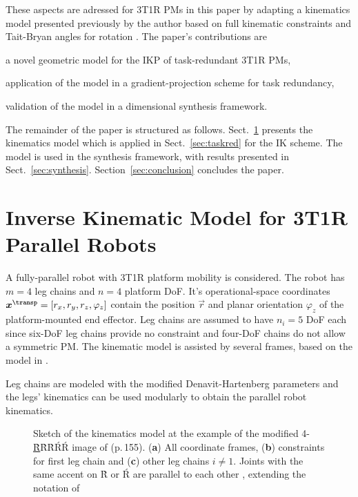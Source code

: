 \documentclass[
	graybox,
	vecphys] %
	{svmult}
\newcommand{\ortvek}[4]{{ }_{(#1)}{\boldsymbol{#2}}^{#3}_{#4} }
\begin{document}
These aspects are adressed for 3T1R PMs in this paper by adapting a kinematics model presented previously by the author based on full kinematic constraints and Tait-Bryan angles for rotation \cite{SchapplerTapOrt2019}.
%
The paper's contributions are
\begin{compactitem}
\item a novel geometric model for the IKP of task-redundant 3T1R PMs, 
\item application of the model in a gradient-projection scheme for task redundancy,
\item validation of the model in a dimensional synthesis framework.
\end{compactitem}

The remainder of the paper is structured as follows. Sect.~\ref{sec:model} presents the kinematics model which is applied in 
Sect.~\ref{sec:taskred} for the IK scheme.
The model is used in the synthesis framework, with results presented in Sect.~\ref{sec:synthesis}.
Section~\ref{sec:conclusion} concludes the paper.

\vspace{-0.3cm}
\section{Inverse Kinematic Model for 3T1R Parallel Robots}
\label{sec:model}

A fully-parallel robot with 3T1R platform mobility is considered.
The robot has $m=4$ leg chains and $n=4$ platform DoF.
It's operational-space coordinates $\vec{x}^\transp=[r_x,r_y,r_z,\varphi_z]$ contain the position $\vec{r}$ and planar orientation $\varphi_z$ of the platform-mounted end effector. %
Leg chains are assumed to have $n_i=5$ DoF each since six-DoF leg chains provide no constraint and four-DoF chains do not allow a symmetric PM.
%
The kinematic model is assisted by several frames, based on the model in \cite{BriotKha2015}.

Leg chains are modeled with the modified Denavit-Hartenberg parameters \cite{BriotKha2015} and the legs' kinematics can be used modularly to obtain the parallel robot kinematics.

\begin{figure}[tb]
\vspace{-0.1cm}

\caption{Sketch of the kinematics model at the example of the modified 4-\underline{\`R}\`R\`R\'R\'R image of \cite{KongGos2007} (p.\,155). (\textbf{a}) All coordinate frames, (\textbf{b}) constraints for first leg chain and (\textbf{c}) other leg chains $i{\ne}1$. Joints with the same accent on \`R or \'R are parallel to each other \cite{KongGos2007}, extending the notation of \cite{Merlet2006}}
\label{fig:kinematic_principle}
\vspace{-0.2cm}
\end{figure}
\end{document}
